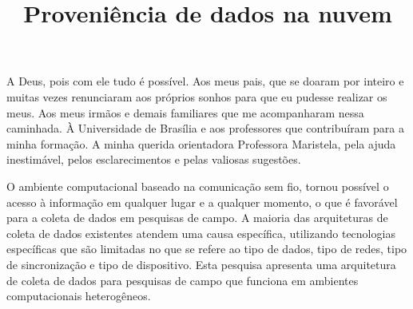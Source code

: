 \message{ !name(monografia.tex)}\documentclass[mestrado]{unb-cic}
\title{Proveniência de dados na nuvem}
\begin{document}


\maketitle

\pretextual

\begin{agradecimentos}
A Deus, pois com ele tudo é possível. Aos meus pais, que se doaram por inteiro e muitas vezes renunciaram aos próprios sonhos para que eu pudesse realizar os meus. Aos meus irmãos e demais familiares que me acompanharam nessa caminhada. À Universidade de Brasília e aos professores que contribuíram para a minha formação. A minha querida orientadora Professora Maristela, pela ajuda inestimável, pelos esclarecimentos e pelas valiosas sugestões.
\end{agradecimentos}

\begin{resumo}
O ambiente computacional baseado na comunicação sem fio, tornou possível o acesso à informação em qualquer lugar e a qualquer momento, o que é favorável para a coleta de dados em pesquisas de campo. A maioria das arquiteturas de coleta de dados existentes atendem uma causa específica, utilizando tecnologias específicas que são limitadas no que se refere ao tipo de dados, tipo de redes, tipo de sincronização e tipo de dispositivo. Esta pesquisa apresenta uma arquitetura de coleta de dados para pesquisas de campo que funciona em ambientes computacionais heterogêneos.
\end{resumo}



\tableofcontents
\listoffigures

\textual




%
%


\postextual





\end{document}
